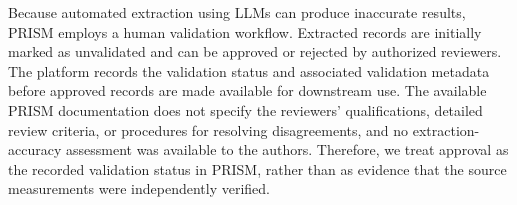 Because automated extraction using LLMs can produce inaccurate results, PRISM employs a human validation workflow.
Extracted records are initially marked as unvalidated and can be approved or rejected by authorized reviewers.
The platform records the validation status and associated validation metadata before approved records are made available for downstream use.
The available PRISM documentation does not specify the reviewers' qualifications, detailed review criteria, or procedures for resolving disagreements, and no extraction-accuracy assessment was available to the authors.
Therefore, we treat approval as the recorded validation status in PRISM, rather than as evidence that the source measurements were independently verified.
